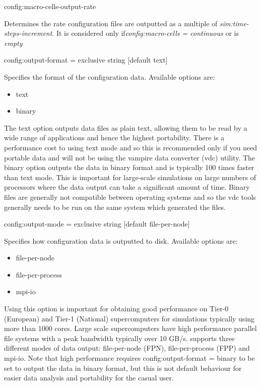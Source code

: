 {\zicf config:macro-cells-output-rate} Determines the rate configuration files are outputted as a multiple of \textit{sim:time-steps-increment}. It is considered only if\newline \textit{config:macro-cells = continuous} or is \textit{empty}

{\zicf config:output-format = exclusive string [default text]}
Specifies the format of the configuration data. Available options are:

\begin{itemize}
  \item[] text
  \item[] binary
\end{itemize}

The text option outputs data files as plain text, allowing them to be read by a wide range of applications and hence the highest portability. There is a performance cost to using text mode and so this is recommended only if you need portable data and will not be using the vampire data converter (vdc) utility. The binary option outputs the data in binary format and is typically 100 times faster than text mode. This is important for large-scale simulations on large numbers of processors where the data output can take a significant amount of time. Binary files are generally not compatible between operating systems and so the vdc tools generally needs to be run on the same system which generated the
files.

{\zicf config:output-mode = exclusive string [default file-per-node]}
Specifies how configuration data is outputted to disk. Available options are:

\begin{itemize}
  \item[] file-per-node
  \item[] file-per-process
  \item[] mpi-io
\end{itemize}

Using this option is important for obtaining good performance on Tier-0 (European) and Tier-1 (National) supercomputers for simulations typically using more than 1000 cores. Large scale supercomputers have high performance parallel file systems with a peak bandwidth typically over 10 GB/s. \vampire supports three different modes of data output: file-per-node (FPN), file-per-process (FPP) and mpi-io. Note that high performance requires
config:output-format = binary to be set to output the data in binary format, but this is not default behaviour for easier data analysis and portability for the casual user.

